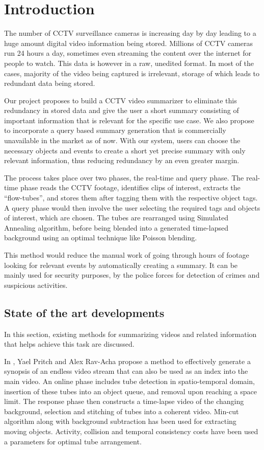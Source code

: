 \chapter{Introduction}

The number of CCTV surveillance cameras is increasing day by day leading to a huge amount digital video information being stored. Millions of CCTV cameras run 24 hours a day, sometimes even streaming the content over the internet for people to watch. This data is however in a raw, unedited format. In most of the cases, majority of the video being captured is irrelevant, storage of which leads to redundant data being stored.

Our project proposes to build a CCTV video summarizer to eliminate this redundancy in stored data and give the user a short summary consisting of important information that is relevant for the specific use case. We also propose to incorporate a query based summary generation that is commercially unavailable in the market as of now. With our system, users can choose the necessary objects and events to create a short yet precise summary with only relevant information, thus reducing redundancy by an even greater margin.

The process takes place over two phases, the real-time and query phase. The real-time phase reads the CCTV footage, identifies clips of interest, extracts the “flow-tubes”, and stores them after tagging them with the respective object tags. A query phase would then involve the user selecting the required tags and objects of interest, which are chosen. The tubes are rearranged using Simulated Annealing algorithm, before being blended into a generated time-lapsed background using an optimal technique like Poisson blending.

This method would reduce the manual work of going through hours of footage looking for relevant events by automatically creating a summary. It can be mainly used for security purposes, by the police forces for detection of crimes and suspicious activities.


\section{State of the art developments}

In this section, existing methods for summarizing videos and related information that helps achieve this task are discussed.

In \cite{rav2006making}, Yael Pritch and Alex Rav-Acha propose a method to effectively generate a synopsis of an endless video stream that can also be used as an index into the main video. An online phase includes tube detection in spatio-temporal domain, insertion of these tubes into an object queue, and removal upon reaching a space limit. The response phase then constructs a time-lapse video of the changing background, selection and stitching of tubes into a coherent video. Min-cut algorithm along with background subtraction has been used for extracting moving objects. Activity, collision and temporal consistency costs have been used a parameters for optimal tube arrangement.

